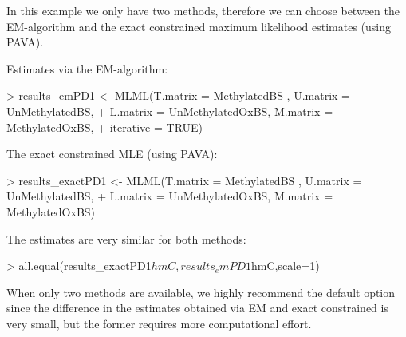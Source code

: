 \documentclass{article}
\begin{document}
In this example we only have two methods, therefore we can choose between the EM-algorithm and the exact constrained maximum likelihood estimates (using PAVA).

Estimates via the EM-algorithm:

\begin{Schunk}
\begin{Sinput}
> results_emPD1 <- MLML(T.matrix = MethylatedBS , U.matrix = UnMethylatedBS,
+                    L.matrix = UnMethylatedOxBS, M.matrix = MethylatedOxBS,
+                    iterative = TRUE)
\end{Sinput}
\end{Schunk}


The exact constrained MLE (using PAVA):

\begin{Schunk}
\begin{Sinput}
> results_exactPD1 <- MLML(T.matrix = MethylatedBS , U.matrix = UnMethylatedBS,
+                       L.matrix = UnMethylatedOxBS, M.matrix = MethylatedOxBS)
\end{Sinput}
\end{Schunk}

The estimates are very similar for both methods:
\begin{Schunk}
\begin{Sinput}
> all.equal(results_exactPD1$hmC,results_emPD1$hmC,scale=1)
\end{Sinput}
\end{Schunk}

When only two methods are available, we highly recommend the default option  since the difference in the estimates obtained via EM and exact constrained is very small, but the former requires more computational effort.




\end{document}

